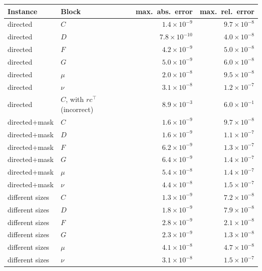 \begin{tabular}{llrr}
\toprule
Instance & Block & max.\ abs.\ error & max.\ rel.\ error\\
\midrule
directed & $C$ & $1.4\times10^{-9}$ & $9.7\times10^{-8}$\\
directed & $D$ & $7.8\times10^{-10}$ & $4.0\times10^{-8}$\\
directed & $F$ & $4.2\times10^{-9}$ & $5.0\times10^{-8}$\\
directed & $G$ & $5.0\times10^{-9}$ & $6.0\times10^{-8}$\\
directed & $\mu$ & $2.0\times10^{-8}$ & $9.5\times10^{-8}$\\
directed & $\nu$ & $3.1\times10^{-8}$ & $1.2\times10^{-7}$\\
directed & $C$, with $rc^\top$ (incorrect) & $8.9\times10^{-3}$ & $6.0\times10^{-1}$\\
directed+mask & $C$ & $1.6\times10^{-9}$ & $9.7\times10^{-8}$\\
directed+mask & $D$ & $1.6\times10^{-9}$ & $1.1\times10^{-7}$\\
directed+mask & $F$ & $6.2\times10^{-9}$ & $1.3\times10^{-7}$\\
directed+mask & $G$ & $6.4\times10^{-9}$ & $1.4\times10^{-7}$\\
directed+mask & $\mu$ & $5.4\times10^{-8}$ & $1.4\times10^{-7}$\\
directed+mask & $\nu$ & $4.4\times10^{-8}$ & $1.5\times10^{-7}$\\
different sizes & $C$ & $1.3\times10^{-9}$ & $7.2\times10^{-8}$\\
different sizes & $D$ & $1.8\times10^{-9}$ & $7.9\times10^{-8}$\\
different sizes & $F$ & $2.8\times10^{-9}$ & $2.1\times10^{-8}$\\
different sizes & $G$ & $2.3\times10^{-9}$ & $1.3\times10^{-8}$\\
different sizes & $\mu$ & $4.1\times10^{-8}$ & $4.7\times10^{-8}$\\
different sizes & $\nu$ & $3.1\times10^{-8}$ & $1.5\times10^{-7}$\\
\bottomrule
\end{tabular}
